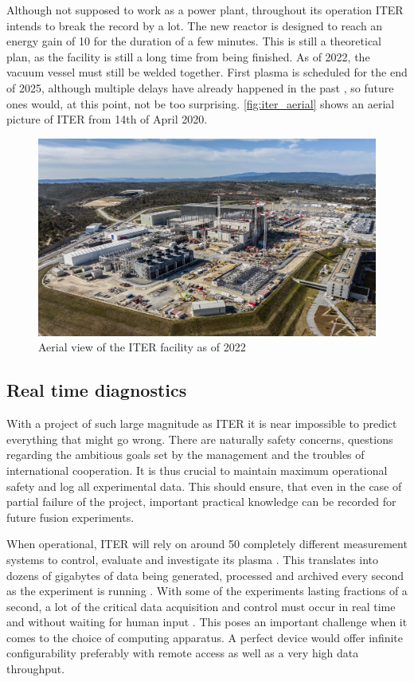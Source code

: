 	Although not supposed to work as a power plant, 
	throughout its operation ITER intends to break the record by a lot.
	The new reactor is designed to reach an energy gain of 10 
	for the duration of a few minutes. This is still a theoretical
	plan, as the facility is still a long time from being finished.
	As of 2022, the vacuum vessel must still be welded together\cite{iter_timeline}.
	First plasma is scheduled for the end of 2025\cite{iter_timeline},
	although multiple delays have already happened in the past \cite{iter_delays},
	so future ones would, at this point, not be too surprising. 
	\autoref{fig:iter_aerial} shows an aerial picture of ITER from 14th of April 2020.
	\begin{figure}[H]
	  \centering
	  \includegraphics[width=.8\linewidth]{media/iter_aerial_2022.jpg}
	  \caption{Aerial view of the ITER facility as of 2022\cite{iter_website}}
	  \label{fig:iter_aerial}
	\end{figure}

\subsection{Real time diagnostics}

	With a project of such large magnitude as ITER it is near impossible to predict
	everything that might go wrong. There are naturally safety concerns,
	questions regarding the ambitious goals set by the management and
	the troubles of international cooperation\cite{iter_delays}.
	It is thus crucial to maintain maximum operational safety 
	and log all experimental data. This should ensure, that even in the 
	case of partial failure of the project, important practical knowledge
	can be recorded for future fusion experiments.


	When operational, ITER will rely on around 50 completely different
	measurement systems to control, evaluate and investigate its plasma 
	\cite{iter_diagnostics_count}.
	This translates into dozens of gigabytes of data being generated, 
	processed and archived every second as the experiment is running 
	\cite{iter_data_throughput}.
	With some of the experiments lasting fractions of a second,
	a lot of the critical data acquisition and control must occur
	in real time and without waiting for human input 
	\cite{iter_realtime_processing}.
	This poses an important challenge when it comes to the choice
	of computing apparatus. A perfect device would offer
	infinite configurability preferably with remote access 
	as well as a very high data throughput. 


